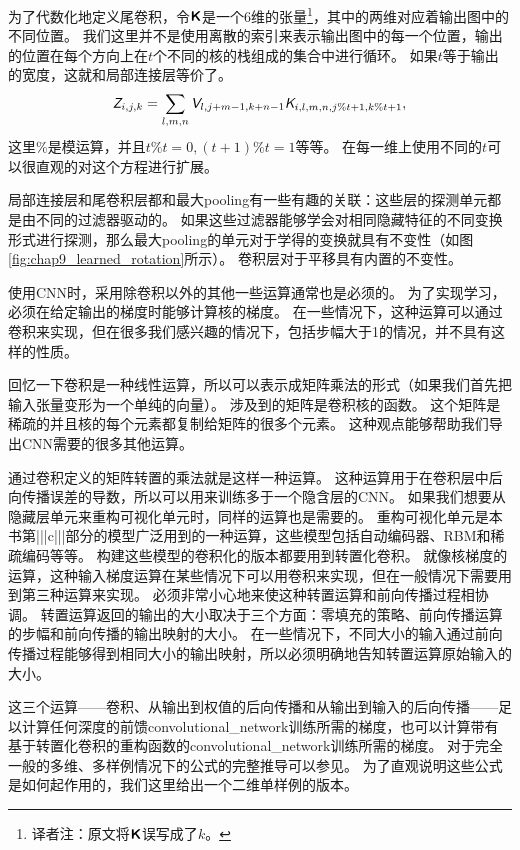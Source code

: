  
为了代数化地定义尾卷积，令$\textsf{\textbf{K}}$是一个6维的张量\footnote{译者注：原文将$\textsf{\textbf{K}}$误写成了$k$。}，其中的两维对应着输出图中的不同位置。%
我们这里并不是使用离散的索引来表示输出图中的每一个位置，输出的位置在每个方向上在$t$个不同的核的栈组成的集合中进行循环。
如果$t$等于输出的宽度，这就和局部连接层等价了。
\begin{equation}
\textit{\textsf{Z}}_{i, j, k} = \sum_{l, m, n} \textit{\textsf{V}}_{l, j+m-1, k+n-1} \textit{\textsf{K}}_{i, l, m, n, j\% t +1, k\% t+1},
\end{equation}
这里$\%$是模运算，并且$t\% t =0, (t+1)\% t = 1$等等。
在每一维上使用不同的$t$可以很直观的对这个方程进行扩展。%
 
  
 
局部连接层和尾卷积层都和最大\gls{pooling}有一些有趣的关联：这些层的探测单元都是由不同的过滤器驱动的。
如果这些过滤器能够学会对相同隐藏特征的不同变换形式进行探测，那么最大\gls{pooling}的单元对于学得的变换就具有不变性（如图\ref{fig:chap9_learned_rotation}所示）。
卷积层对于平移具有内置的不变性。
 
 
使用\gls{CNN}时，采用除卷积以外的其他一些运算通常也是必须的。
为了实现学习，必须在给定输出的梯度时能够计算核的梯度。
在一些情况下，这种运算可以通过卷积来实现，但在很多我们感兴趣的情况下，包括步幅大于1的情况，并不具有这样的性质。

回忆一下卷积是一种线性运算，所以可以表示成矩阵乘法的形式（如果我们首先把输入张量变形为一个单纯的向量）。
涉及到的矩阵是卷积核的函数。
这个矩阵是稀疏的并且核的每个元素都复制给矩阵的很多个元素。
这种观点能够帮助我们导出\gls{CNN}需要的很多其他运算。

通过卷积定义的矩阵转置的乘法就是这样一种运算。
这种运算用于在卷积层中后向传播误差的导数，所以可以用来训练多于一个隐含层的\gls{CNN}。
如果我们想要从隐藏层单元来重构可视化单元时，同样的运算也是需要的\citep{Simard92-short}。
重构可视化单元是本书第|||c|||部分的模型广泛用到的一种运算，这些模型包括自动编码器、RBM和稀疏编码等等。
构建这些模型的卷积化的版本都要用到转置化卷积。
就像核梯度的运算，这种输入梯度运算在某些情况下可以用卷积来实现，但在一般情况下需要用到第三种运算来实现。
必须非常小心地来使这种转置运算和前向传播过程相协调。
转置运算返回的输出的大小取决于三个方面：零填充的策略、前向传播运算的步幅和前向传播的输出映射的大小。
在一些情况下，不同大小的输入通过前向传播过程能够得到相同大小的输出映射，所以必须明确地告知转置运算原始输入的大小。

这三个运算——卷积、从输出到权值的后向传播和从输出到输入的后向传播——足以计算任何深度的前馈\gls{convolutional_network}训练所需的梯度，也可以计算带有基于转置化卷积的重构函数的\gls{convolutional_network}训练所需的梯度。
对于完全一般的多维、多样例情况下的公式的完整推导可以参见\cite{Goodfellow-TR2010}。 
为了直观说明这些公式是如何起作用的，我们这里给出一个二维单样例的版本。
 
